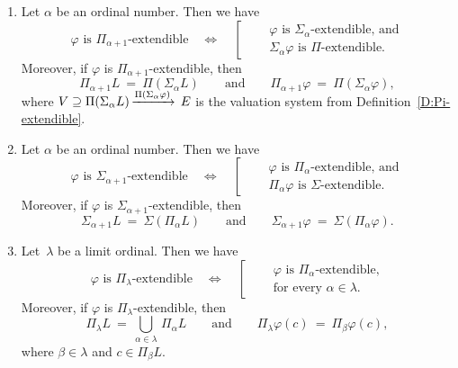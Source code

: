 \documentclass[main.tex]{subfiles}
\begin{document}
\begin{dfn}
\begin{enumerate}
\item
Let $\alpha$ be an ordinal number.
Then we have
\begin{equation*}
\text{$\varphi$ is {$\Pi_{\alpha+1}$-extendible}}
\quad\iff\quad
\left[\quad
\begin{alignedat}{3}
&\varphi \text{ is $\Sigma_{\alpha}$-extendible, and}\\
&\Sigma_\alpha\varphi  \text{ is $\Pi$-extendible.}
\end{alignedat}
\right.
\end{equation*}
Moreover, if $\varphi$ is $\Pi_{\alpha+1}$-extendible,
then 
\begin{equation*}
\Pi_{\alpha+1} L \ =\  \Pi(\Sigma_\alpha L)\qquad\text{and}\qquad
\Pi_{\alpha+1} \varphi \ =\  \Pi(\Sigma_\alpha \varphi),
\end{equation*}
where 
 $V \supseteq \Pi(\Sigma_\alpha L)\,\smash{\xrightarrow{\Pi(\Sigma_\alpha\varphi)}\,E}$
is the valuation system from Definition~\ref{D:Pi-extendible}.

\item
Let $\alpha$ be an ordinal number.
Then we have
\begin{equation*}
\text{$\varphi$ is {$\Sigma_{\alpha+1}$-extendible}}
\quad\iff\quad
\left[\quad
\begin{alignedat}{3}
&\text{$\varphi$ is $\Pi_{\alpha}$-extendible, and}\\
&\text{$\Pi_\alpha \varphi$ is $\Sigma$-extendible.}
\end{alignedat}
\right.
\end{equation*}
Moreover,
if $\varphi$ is $\Sigma_{\alpha+1}$-extendible,
then 
\begin{equation*}
\Sigma_{\alpha+1} L \ =\  \Sigma(\Pi_\alpha L)\qquad\text{and}\qquad
\Sigma_{\alpha+1} \varphi \ =\  \Sigma(\Pi_\alpha \varphi).
\end{equation*}

\item
Let~$\lambda$ be a limit ordinal.
Then
we have 
\begin{equation*}
\text{$\varphi$ is {$\Pi_\lambda$-extendible}}
\quad\iff\quad
\left[\quad
\begin{alignedat}{3}
&\text{$\varphi$ is $\Pi_\alpha$-extendible,}\\
&\text{for every~$\alpha \in \lambda$}.
\end{alignedat}
\right.
\end{equation*}
Moreover,
if $\varphi$ is $\Pi_\lambda$-extendible,
then 
\begin{equation*}
\Pi_\lambda L \ =\  \textstyle{\bigcup_{\alpha \in \lambda}\, \Pi_\alpha L}
\qquad\text{and}\qquad
\Pi_\lambda \varphi (c) \ =\  \Pi_\beta \varphi(c),
\end{equation*}
where $\beta \in \lambda$ and $c\in \Pi_\beta L$.


\end{enumerate}
\end{dfn}
\end{document}
